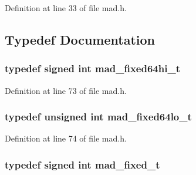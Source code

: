 Definition at line 33 of file mad.\+h.



\subsection{Typedef Documentation}
\subsubsection[{\texorpdfstring{mad\+\_\+fixed64hi\+\_\+t}{mad_fixed64hi_t}}]{\setlength{\rightskip}{0pt plus 5cm}typedef signed {\bf int} {\bf mad\+\_\+fixed64hi\+\_\+t}}\hypertarget{lib-src_2libmad_2msvc_09_09_2mad_8h_ae47027c34651060a730a7d8266c45307}{}\label{lib-src_2libmad_2msvc_09_09_2mad_8h_ae47027c34651060a730a7d8266c45307}


Definition at line 73 of file mad.\+h.

\subsubsection[{\texorpdfstring{mad\+\_\+fixed64lo\+\_\+t}{mad_fixed64lo_t}}]{\setlength{\rightskip}{0pt plus 5cm}typedef unsigned {\bf int} {\bf mad\+\_\+fixed64lo\+\_\+t}}\hypertarget{lib-src_2libmad_2msvc_09_09_2mad_8h_a739f4d59695c7a51dfeccc623d0fda80}{}\label{lib-src_2libmad_2msvc_09_09_2mad_8h_a739f4d59695c7a51dfeccc623d0fda80}


Definition at line 74 of file mad.\+h.

\subsubsection[{\texorpdfstring{mad\+\_\+fixed\+\_\+t}{mad_fixed_t}}]{\setlength{\rightskip}{0pt plus 5cm}typedef signed {\bf int} {\bf mad\+\_\+fixed\+\_\+t}}\hypertarget{lib-src_2libmad_2msvc_09_09_2mad_8h_a5086b0f25866d1a5d2511e1c9824dfe6}{}\label{lib-src_2libmad_2msvc_09_09_2mad_8h_a5086b0f25866d1a5d2511e1c9824dfe6}


